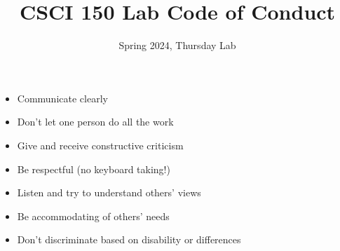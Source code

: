\documentclass{tufte-handout}
\title{CSCI 150 Lab Code of Conduct}
\date{Spring 2024, Thursday Lab}
\begin{document}
\maketitle

\begin{itemize}
\item Communicate clearly
\item Don't let one person do all the work
\item Give and receive constructive criticism
\item Be respectful (no keyboard taking!)
\item Listen and try to understand others' views
\item Be accommodating of others' needs
\item Don't discriminate based on disability or differences
\end{itemize}
\end{document}
